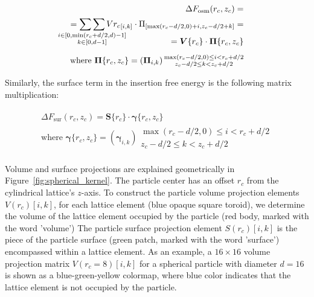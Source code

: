 \documentclass[10pt, a4paper]{article}
\begin{document}
\begin{multicols}{2}
\begin{eqnarray}
    \begin{split}
        \Delta F_{\text{osm}}(r_c, z_c) =\\
        = \mathop{\sum\sum}_{\mathclap{\substack{i \in [0, \min(r_c+d/2,d)-1] \\ k \in [0, d-1]}}} V{r_c}_{[i, k]} \cdot \Pi_{[\max(r_c-d/2,0)+i, z_c-d/2+k]} =\\[-15pt]
        = \bm{V}\{r_c\} \cdot \bm{\Pi}\{r_c, z_c\} \\[5pt]
        \text{where } \bm{\Pi}\{r_c,z_c\} =\left(\bm{\Pi}_{i,k}\right) {\substack{\max(r_c-d/2,0) \le i < r_c+d/2 \\ z_c-d/2 \le k < z_c+d/2}}
    \end{split}
\end{eqnarray}

Similarly, the surface term in the insertion free energy is the following matrix multiplication:

\begin{eqnarray}
    \begin{split}
        \Delta F_{\text{sur}}(r_c, z_c) = \bm{S}\{r_c\} \cdot \bm{\gamma}\{r_c, z_c\} \\[5pt]
        \text{where } \bm{\gamma}\{r_c,z_c\} =\left(\bm{\gamma}_{i,k}\right) {\substack{\max(r_c-d/2,0) \le i < r_c+d/2 \\ z_c-d/2 \le k < z_c+d/2}}
    \end{split}
\end{eqnarray}

Volume and surface projections are explained geometrically in Figure~\ref{fig:spherical_kernel}.
The particle center has an offset $r_c$ from the cylindrical lattice's $z$-axis.
To construct the particle volume projection elements $V(r_c)[i, k]$, for each lattice element (blue opaque square toroid), we determine the volume of the lattice element occupied by the particle (red body, marked with the word 'volume')
The particle surface projection element $S(r_c)[i, k]$ is the piece of the particle surface (green patch, marked with the word 'surface') encompassed within a lattice element.
As an example, a $16 \times 16$ volume projection matrix $V(r_c = 8)[i, k]$ for a spherical particle with diameter $d = 16$ is shown as a blue-green-yellow colormap, where blue color indicates that the lattice element is not occupied by the particle.


\end{multicols}

\pagebreak
\end{document}
